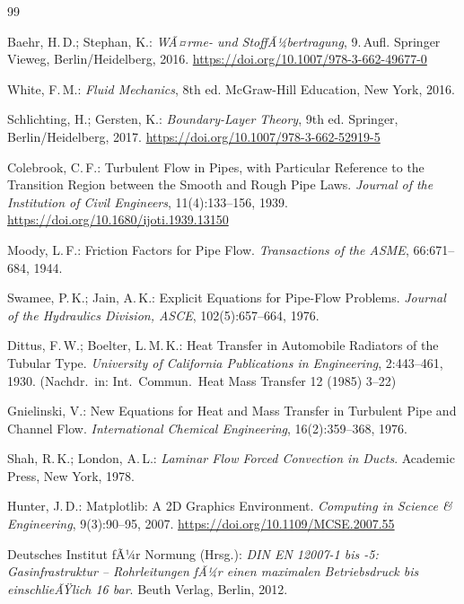 ﻿\documentclass[12pt,a4paper,twoside]{article}
\theoremstyle{plain}
\theoremstyle{definition}
\theoremstyle{remark}
\begin{document}
\begin{thebibliography}{99}

Baehr, H.\,D.; Stephan, K.:
\textit{WÃ¤rme- und StoffÃ¼bertragung}, 9.\,Aufl.
Springer Vieweg, Berlin/Heidelberg, 2016.
\url{https://doi.org/10.1007/978-3-662-49677-0}

White, F.\,M.:
\textit{Fluid Mechanics}, 8th ed.
McGraw-Hill Education, New York, 2016.

Schlichting, H.; Gersten, K.:
\textit{Boundary-Layer Theory}, 9th ed.
Springer, Berlin/Heidelberg, 2017.
\url{https://doi.org/10.1007/978-3-662-52919-5}

Colebrook, C.\,F.:
Turbulent Flow in Pipes, with Particular Reference to the Transition Region
between the Smooth and Rough Pipe Laws.
\textit{Journal of the Institution of Civil Engineers}, 11(4):133--156, 1939.
\url{https://doi.org/10.1680/ijoti.1939.13150}

Moody, L.\,F.:
Friction Factors for Pipe Flow.
\textit{Transactions of the ASME}, 66:671--684, 1944.

Swamee, P.\,K.; Jain, A.\,K.:
Explicit Equations for Pipe-Flow Problems.
\textit{Journal of the Hydraulics Division, ASCE}, 102(5):657--664, 1976.

Dittus, F.\,W.; Boelter, L.\,M.\,K.:
Heat Transfer in Automobile Radiators of the Tubular Type.
\textit{University of California Publications in Engineering}, 2:443--461, 1930.
(Nachdr.\ in: Int.\ Commun.\ Heat Mass Transfer 12 (1985) 3--22)

Gnielinski, V.:
New Equations for Heat and Mass Transfer in Turbulent Pipe and Channel Flow.
\textit{International Chemical Engineering}, 16(2):359--368, 1976.

Shah, R.\,K.; London, A.\,L.:
\textit{Laminar Flow Forced Convection in Ducts}.
Academic Press, New York, 1978.

Hunter, J.\,D.:
Matplotlib: A 2D Graphics Environment.
\textit{Computing in Science \& Engineering}, 9(3):90--95, 2007.
\url{https://doi.org/10.1109/MCSE.2007.55}

Deutsches Institut fÃ¼r Normung (Hrsg.):
\textit{DIN EN 12007-1 bis -5: Gasinfrastruktur -- Rohrleitungen fÃ¼r einen
maximalen Betriebsdruck bis einschlieÃŸlich 16 bar}.
Beuth Verlag, Berlin, 2012.


\end{thebibliography}
\end{document}
